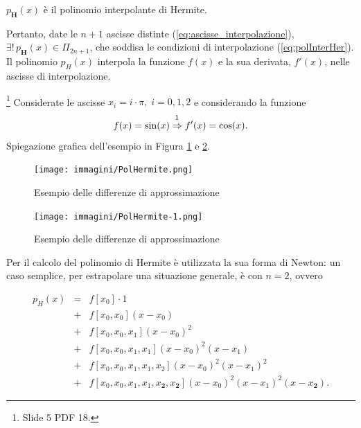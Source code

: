 \begin{definition}
    $p_{\boldsymbol H}(x)$ è il polinomio interpolante di Hermite.  
\end{definition}

Pertanto, date le $n+1$ ascisse distinte (\ref{eq:ascisse_interpolazione}), $\exists!\, p_{\boldsymbol H}(x)\in\Pi_{2n+1}$, che soddisa le condizioni di interpolazione (\ref{eq:polInterHer}). Il polinomio $p_H(x)$ interpola la funzione $f(x)$ e la sua derivata, $f'(x)$, nelle ascisse di interpolazione.

\begin{example}\footnote{Slide 5 PDF 18.}
    Considerate le ascisse $x_i=i\cdot\pi,\; i=0,1,2$ e considerando la funzione
    \begin{equation*}
        f(x)=\sin(x)\overset{\footnotemark}{\Rightarrow}f'(x)=\cos(x).
    \end{equation*}
    Spiegazione grafica dell'esempio in Figura \ref{fig:PolHermite} e \ref{fig:PolHermite1}. 
\end{example}

\begin{figure}
\centering
\texttt{[image: immagini/PolHermite.png]}
\caption{\label{fig:PolHermite} Esempio delle differenze di approssimazione}
\end{figure}
\begin{figure}
\centering
\texttt{[image: immagini/PolHermite-1.png]}
\caption{\label{fig:PolHermite1} Esempio delle differenze di approssimazione}
\end{figure}

\begin{remark}
    Per il calcolo del polinomio di Hermite è utilizzata la sua forma di Newton: un caso semplice, per estrapolare una situazione generale, è con $n=2$, ovvero

    \begin{equation*}
        \begin{matrix}
            p_H(x)&=& f[x_0]\cdot 1\\
            &+& f[x_0,x_0](x-x_0)\\
            &+& f[x_0,x_0,x_1](x-x_0)^2\\
            &+& f[x_0,x_0,x_1,x_1](x-x_0)^2(x-x_1)\\
            &+& f[x_0,x_0,x_1,x_1,x_2](x-x_0)^2(x-x_1)^2\\
            &+& f[x_0,x_0,x_1,x_1,x_{\boldsymbol 2},x_{\boldsymbol 2}](x-x_0)^2(x-x_1)^2(x-x_{\boldsymbol 2}).
        \end{matrix}
    \end{equation*}
\end{remark}

